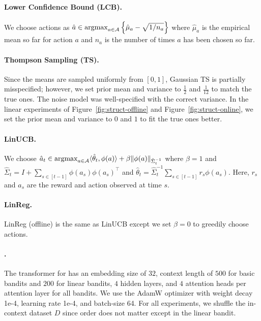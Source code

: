 \paragraph{Lower Confidence Bound (LCB).}
We choose actions as    $\hat a \in \mathop{\mathrm{argmax}}_{a \in \mathcal{A}} \left\{  \hat \mu_a - \sqrt{1 / n_a} \right\}$
where $\hat \mu_a$ is the empirical mean so far for action $a$ and $n_a$ is the number of times $a$ has been chosen so far. 


\paragraph{Thompson Sampling (TS).} Since the means are sampled uniformly from $[0, 1]$, Gaussian TS is partially misspecified; however, we set prior mean and variance to $\frac{1}{2}$ and $\frac{1}{12}$ to match the true ones. The noise model was well-specified with the correct variance. In the linear experiments of Figure~\ref{fig:struct-offline} and Figure~\ref{fig:struct-online}, we set the prior mean and variance to $0$ and $1$ to fit the true ones better.

\paragraph{LinUCB.} We choose $\hat a_t \in \mathop{\mathrm{argmax}}_{a \in \mathcal{A}} \langle{ \hat \theta_t},{\phi(a)}\rangle + \beta \| \phi(a) \|_{\hat \Sigma^{-1}_t}$ where $\beta = 1$ and $\hat \Sigma_t = I + \sum_{s \in [t- 1] }  \phi(a_s)\phi(a_s)^\top$ and $\hat \theta_t = \hat \Sigma^{-1}_t \sum_{s \in [t - 1]} r_s \phi(a_s)$. Here, $r_s$ and $a_s$ are the reward and action observed at time $s$.

\paragraph{LinReg.} LinReg (offline) is the same as LinUCB except we set $\beta = 0$ to greedily choose actions.

\paragraph{\macroName{}.} The transformer for \macroName{} has an embedding size of $32$, context length of $500$ for basic bandits and $200$ for linear bandits, $4$ hidden layers, and $4$ attention heads per attention layer for all bandits. We use the AdamW optimizer with weight decay 1e-4, learning rate 1e-4, and batch-size 64. For all experiments, we shuffle the in-context dataset $D$ since order does not matter except in the linear bandit.


